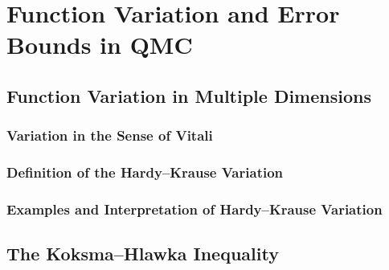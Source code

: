 \chapter{Function Variation and Error Bounds in QMC}
\label{chapter3}


\section{Function Variation in Multiple Dimensions}



  \subsection{Variation in the Sense of Vitali}



  \subsection{Definition of the Hardy--Krause Variation}



  \subsection{Examples and Interpretation of Hardy--Krause Variation}




\section{The Koksma--Hlawka Inequality}



